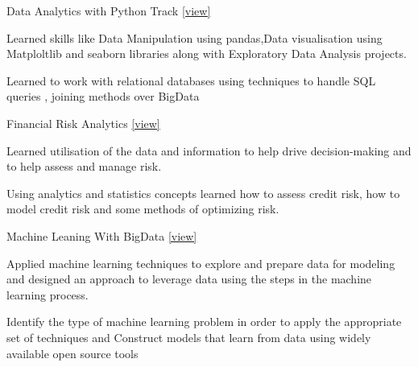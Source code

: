 
\begin{cventries}
  \cventry
    {} %
    {Data Analytics with Python Track \hspace{0.3cm} \href{https://www.datacamp.com/statement-of-accomplishment/track/981e87bf32022c128cb2b111c0ee66e48d649e48}{{[view] }} \hspace{2.0cm} }
    {} %
    {} %
    {
      \begin{cvitems} %
        \item {Learned skills like Data Manipulation using pandas,Data visualisation using Matploltlib and seaborn libraries along with Exploratory Data Analysis projects.}
		\item {Learned to work with relational databases using techniques to handle SQL queries , joining methods over BigData }
      \end{cvitems}
    }

  \cventry
    {} %
    {Financial Risk Analytics
    \hspace{0.3cm} \href{https://www.datacamp.com/statement-of-accomplishment/track/981e87bf32022c128cb2b111c0ee66e48d649e48}{[view]}
    \hspace{3.00cm} } %
    {} %
    {} %
    {
      \begin{cvitems} %
      	\item {Learned utilisation of the data and information to help drive decision-making and to help assess and manage risk.}
		\item {Using analytics and statistics concepts learned how to assess credit risk, how to model credit risk and some methods of optimizing risk.}
      \end{cvitems}
    }
    
    \cventry
    {} %
    {Machine Leaning With BigData
    \hspace{0.3cm} \href{https://www.coursera.org/account/accomplishments/certificate/ESTWZD2ZHTEP}{[view] }
    \hspace{1.00cm} } %
    {} %
    {} %
    {
      \begin{cvitems} %
      	\item {Applied machine learning techniques to explore and prepare data for modeling and designed an approach to leverage data using the steps in the machine learning process.}
		\item {Identify the type of machine learning problem in order to apply the appropriate set of techniques and Construct models that learn from data using widely available open source tools}
      \end{cvitems}
    }    
\end{cventries}